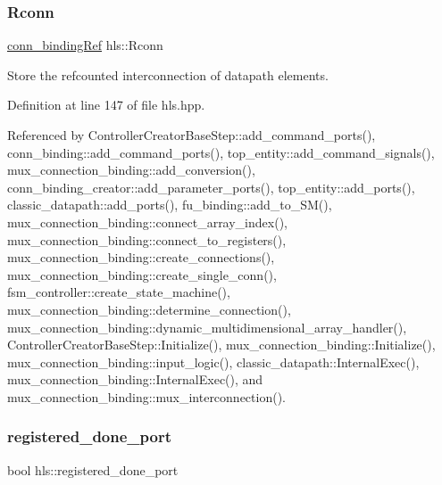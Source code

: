 \mbox{\label{classhls_a2ba012fee9c8ddef38580fc8ed944b4c}} 
\subsubsection{\texorpdfstring{Rconn}{Rconn}}
{\footnotesize\ttfamily \hyperlink{conn__binding_8hpp_a074d084f1d6f4503d815ba91304264a0}{conn\+\_\+binding\+Ref} hls\+::\+Rconn}



Store the refcounted interconnection of datapath elements. 



Definition at line 147 of file hls.\+hpp.



Referenced by Controller\+Creator\+Base\+Step\+::add\+\_\+command\+\_\+ports(), conn\+\_\+binding\+::add\+\_\+command\+\_\+ports(), top\+\_\+entity\+::add\+\_\+command\+\_\+signals(), mux\+\_\+connection\+\_\+binding\+::add\+\_\+conversion(), conn\+\_\+binding\+\_\+creator\+::add\+\_\+parameter\+\_\+ports(), top\+\_\+entity\+::add\+\_\+ports(), classic\+\_\+datapath\+::add\+\_\+ports(), fu\+\_\+binding\+::add\+\_\+to\+\_\+\+S\+M(), mux\+\_\+connection\+\_\+binding\+::connect\+\_\+array\+\_\+index(), mux\+\_\+connection\+\_\+binding\+::connect\+\_\+to\+\_\+registers(), mux\+\_\+connection\+\_\+binding\+::create\+\_\+connections(), mux\+\_\+connection\+\_\+binding\+::create\+\_\+single\+\_\+conn(), fsm\+\_\+controller\+::create\+\_\+state\+\_\+machine(), mux\+\_\+connection\+\_\+binding\+::determine\+\_\+connection(), mux\+\_\+connection\+\_\+binding\+::dynamic\+\_\+multidimensional\+\_\+array\+\_\+handler(), Controller\+Creator\+Base\+Step\+::\+Initialize(), mux\+\_\+connection\+\_\+binding\+::\+Initialize(), mux\+\_\+connection\+\_\+binding\+::input\+\_\+logic(), classic\+\_\+datapath\+::\+Internal\+Exec(), mux\+\_\+connection\+\_\+binding\+::\+Internal\+Exec(), and mux\+\_\+connection\+\_\+binding\+::mux\+\_\+interconnection().

\mbox{\label{classhls_a729d30e5819cf147e13aa42eda07659f}} 
\subsubsection{\texorpdfstring{registered\+\_\+done\+\_\+port}{registered\_done\_port}}
{\footnotesize\ttfamily bool hls\+::registered\+\_\+done\+\_\+port}



